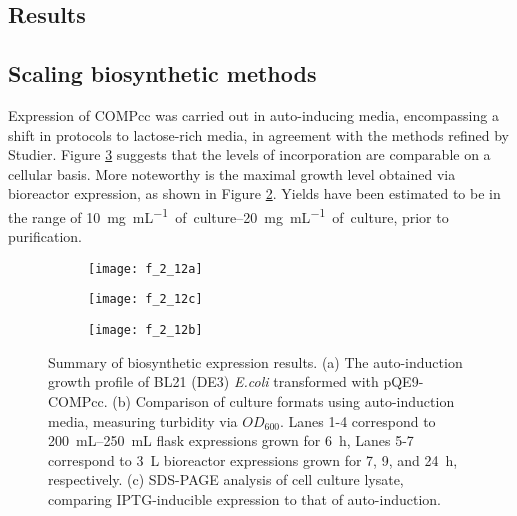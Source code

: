 \begin{refsection}
\section{Results}

\subsection{Scaling biosynthetic methods}

Expression of COMPcc was carried out in auto-inducing media, encompassing a
shift in protocols to lactose-rich media, in agreement with the methods refined
by Studier.\cite{Studier2005} Figure \ref{fig:AI_IPTG_gel} suggests that the
levels of incorporation are comparable on a cellular basis. More noteworthy is
the maximal growth level obtained via bioreactor expression, as shown in Figure
\ref{fig:bioreactor_OD_comparison}. Yields have been estimated to be in the
range of \SIrange{10}{20}{\mg\per\mL of culture}, prior to purification.
\begin{figure}[h!]
    \centering
    \begin{subfigure}[b]{0.3\textwidth}
        \texttt{[image: f\_2\_12a]}
        \caption{}
        \label{fig:AI_OD_curve}
    \end{subfigure}
    \begin{subfigure}[b]{0.3\textwidth}
        \texttt{[image: f\_2\_12c]}
        \caption{}
        \label{fig:bioreactor_OD_comparison}
    \end{subfigure}
    \begin{subfigure}[b]{0.3\textwidth}
        \texttt{[image: f\_2\_12b]}
        \caption{}
        \label{fig:AI_IPTG_gel} \end{subfigure}
    \caption[Summary of biosynthetic expresssion results]{Summary of
        biosynthetic expression results. (a) The auto-induction growth profile
        of BL21 (DE3) \emph{E.coli} transformed with pQE9-COMPcc. (b) Comparison
        of culture formats using auto-induction media, measuring turbidity via
        ${OD_{600}}$. Lanes 1-4 correspond to \SIrange{200}{250}{\mL} flask
        expressions grown for \SI{6}{\hour}, Lanes 5-7 correspond to \SI{3}{\L}
        bioreactor expressions grown for 7, 9, and \SI{24}{\hour}, respectively.
    (c) SDS-PAGE analysis of cell culture lysate, comparing IPTG-inducible
expression to that of auto-induction.}
\label{fig:expression_results}
\end{figure}



\end{refsection}
